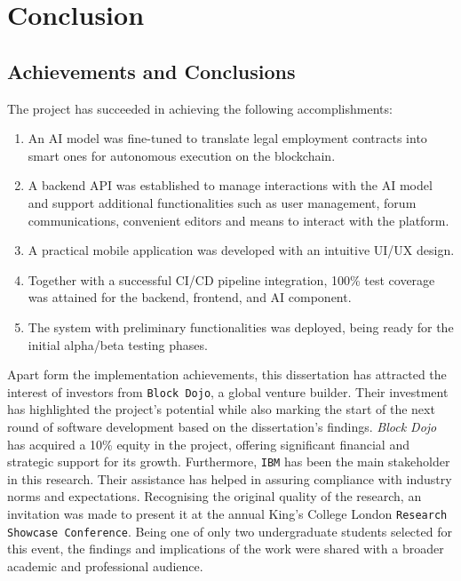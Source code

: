 \chapter{Conclusion}

\section{Achievements and Conclusions}

The project has succeeded in achieving the following accomplishments:

\begin{enumerate}
    \item An AI model was fine-tuned to translate legal employment contracts into smart ones for autonomous execution on the blockchain.
    \item A backend API was established to manage interactions with the AI model and support additional functionalities such as user management, forum communications, convenient editors and means to interact with the platform.
    \item A practical mobile application was developed with an intuitive UI/UX design.
    \item Together with a successful CI/CD pipeline integration, 100\% test coverage was attained for the backend, frontend, and AI component.
    \item The system with preliminary functionalities was deployed, being ready for the initial alpha/beta testing phases.
\end{enumerate}

Apart form the implementation achievements, this dissertation has attracted the interest of investors from \texttt{Block Dojo}, a global venture builder. Their investment has highlighted the project's potential while also marking the start of the next round of software development based on the dissertation's findings. \textit{Block Dojo} has acquired a 10\% equity in the project, offering significant financial and strategic support for its growth. Furthermore, \texttt{IBM} has been the main stakeholder in this research. Their assistance has helped in assuring compliance with industry norms and expectations. Recognising the original quality of the research, an invitation was made to present it at the annual King's College London \texttt{Research Showcase Conference}. Being one of only two undergraduate students selected for this event, the findings and implications of the work were shared with a broader academic and professional audience.

